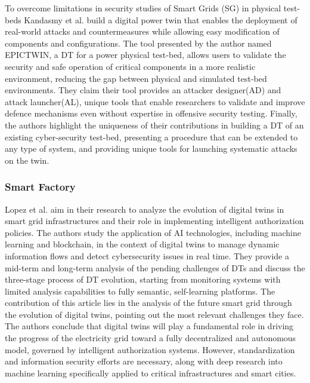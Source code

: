 To overcome limitations in security studies of Smart Grids (SG) in physical test-beds Kandasmy et al.\cite{kandasamyElectricPowerDigital2022} build a digital power twin that enables the deployment of real-world attacks and countermeasures while allowing easy modification of components and configurations. The tool presented by the author named EPICTWIN, a DT for a power physical test-bed, allows users to validate the security and safe operation of critical components in a more realistic environment, reducing the gap between physical and simulated test-bed environments. They claim their tool provides an attacker designer(AD) and attack launcher(AL), unique tools that enable researchers to validate and improve defence mechanisms even without expertise in offensive security testing. Finally, the authors highlight the uniqueness of their contributions in building a DT of an existing cyber-security test-bed, presenting a procedure that can be extended to any type of system, and providing unique tools for launching systematic attacks on the twin.

\subsubsection{Smart Factory}
Lopez et al.\cite{lopezDIGITALTWINSINTELLIGENT2021} aim in their research to analyze the evolution of digital twins in smart grid infrastructures and their role in implementing intelligent authorization policies. The authors study the application of AI technologies, including machine learning and blockchain, in the context of digital twins to manage dynamic information flows and detect cybersecurity issues in real time. They provide a mid-term and long-term analysis of the pending challenges of DTs and discuss the three-stage process of DT evolution, starting from monitoring systems with limited analysis capabilities to fully semantic, self-learning platforms. The contribution of this article lies in the analysis of the future smart grid through the evolution of digital twins, pointing out the most relevant challenges they face. The authors conclude that digital twins will play a fundamental role in driving the progress of the electricity grid toward a fully decentralized and autonomous model, governed by intelligent authorization systems. However, standardization and information security efforts are necessary, along with deep research into machine learning specifically applied to critical infrastructures and smart cities.


